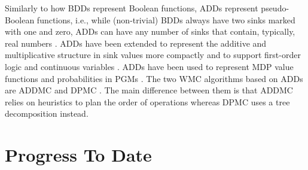\documentclass{article}
\begin{document}
Similarly to how BDDs represent Boolean functions, ADDs represent pseudo-Boolean
functions, i.e., while (non-trivial) BDDs always have two sinks marked with one
and zero, ADDs can have any number of sinks that contain, typically, real
numbers \cite{DBLP:journals/fmsd/BaharFGHMPS97}. ADDs have been extended to
represent the additive and multiplicative structure in sink values more
compactly \cite{DBLP:conf/ijcai/SannerM05} and to support first-order logic
\cite{DBLP:journals/ai/SannerB09} and continuous variables
\cite{DBLP:conf/uai/SannerDB11}. ADDs have been used to represent MDP value
functions \cite{DBLP:conf/uai/HoeySHB99} and probabilities in PGMs
\cite{DBLP:conf/ijcai/ChaviraD07,DBLP:conf/uai/GogateD11}. The two WMC
algorithms based on ADDs are ADDMC \cite{DBLP:conf/aaai/DudekPV20} and DPMC
\cite{DBLP:conf/cp/DudekPV20}. The main difference between them is that ADDMC
relies on heuristics to plan the order of operations whereas DPMC uses a tree
decomposition instead.

\section{Progress To Date} \label{sec:progress}
\end{document}
